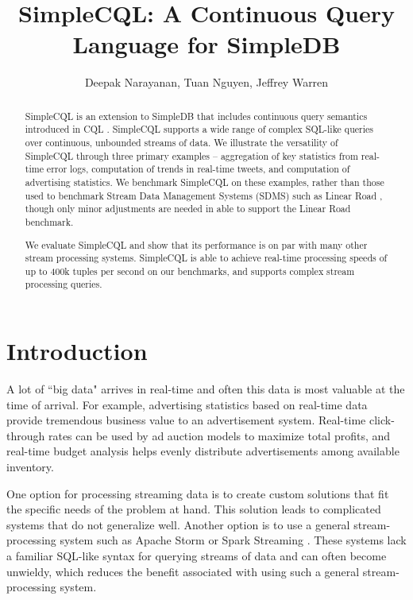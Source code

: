 \documentclass[a4paper, 10pt, conference]{IEEEconf}
\title{\LARGE \bf
SimpleCQL: A Continuous Query Language for SimpleDB
}
\author{Deepak Narayanan, Tuan Nguyen, Jeffrey Warren}
\begin{document}
\maketitle
\thispagestyle{empty}
\pagestyle{empty}


\begin{abstract}

SimpleCQL is an extension to SimpleDB \cite{simpledb} that includes continuous query semantics introduced in CQL \cite{cql}. SimpleCQL supports a wide range of complex SQL-like queries over continuous, unbounded streams of data.  We illustrate the versatility of SimpleCQL through three primary examples -- aggregation of key statistics from real-time error logs, computation of trends in real-time tweets, and computation of advertising statistics.  We benchmark SimpleCQL on these examples, rather than those used to benchmark Stream Data Management Systems (SDMS) such as Linear Road \cite{linear}, though only minor adjustments are needed in able to support the Linear Road benchmark.

We evaluate SimpleCQL and show that its performance is on par with many other stream processing systems.  SimpleCQL is able to achieve real-time processing speeds of up to 400k tuples per second on our benchmarks, and supports complex stream processing queries.

\end{abstract}


\section{Introduction}

A lot of ``big data" arrives in real-time and often this data is most valuable at the time of arrival. For example, advertising statistics based on real-time data provide tremendous business value to an advertisement system.  Real-time click-through rates can be used by ad auction models to maximize total profits, and real-time budget analysis helps evenly distribute advertisements among available inventory.

One option for processing streaming data is to create custom solutions that fit the specific needs of the problem at hand.  This solution leads to complicated systems that do not generalize well.  Another option is to use a general stream-processing system such as Apache Storm \cite{storm} or Spark Streaming \cite{spark_streaming}.  These systems lack a familiar SQL-like syntax for querying streams of data and can often become unwieldy, which reduces the benefit associated with using such a general stream-processing system.
\end{document}
